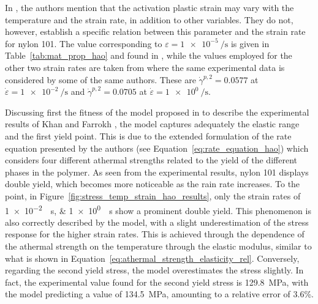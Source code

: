 In \cite{haoUnifiedAmorphousCrystalline2022}, the authors mention that the activation plastic strain may vary with the temperature and the strain rate, in addition to other variables.
They do not, however, establish a specific relation between this parameter and the strain rate for nylon 101.
The value corresponding to $\varepsilon=\SI{1e-5}{\per\second}$ is given in Table~\ref{tab:mat_prop_hao} and found in \cite{haoUnifiedAmorphousCrystalline2022}, while the values employed for the other two strain rates are taken from \cite{haoRatedependentConstitutiveModel2022} where the same experimental data is considered by some of the same authors.
These are $\dot\gamma^{p,2}=\num{0.0577}$ at $\dot\varepsilon = \SI{1e-2}{\per\second}$ and $\dot\gamma^{p,2}=\num{0.0705}$ at $\dot\varepsilon = \SI{1e0}{\per\second}$.

Discussing first the fitness of the model proposed in \cite{haoUnifiedAmorphousCrystalline2022} to describe the experimental results of Khan and Farrokh \citep{khanThermomechanicalResponseNylon2006}, the model captures adequately the elastic range and the first yield point.
This is due to the extended formulation of the rate equation presented by the authors (see Equation~\eqref{eq:rate_equation_hao}) which considers four different athermal strengths related to the yield of the different phases in the polymer.
As seen from the experimental results, nylon 101 displays double yield, which becomes more noticeable as the rain rate increases.
To the point, in Figure~\ref{fig:stress_temp_strain_hao_results}, only the strain rates of \SIlist{1e-2;1e0}{\per\second} show a prominent double yield.
This phenomenon is also correctly described by the model, with a slight underestimation of the stress response for the higher strain rates.
This is achieved through the dependence of the athermal strength on the temperature through the elastic modulus, similar to what is shown in Equation~\eqref{eq:athermal_strength_elasticity_rel}.
Conversely, regarding the second yield stress, the model overestimates the stress slightly.
In fact, the experimental value found for the second yield stress is \SI{129.8}{\mega\pascal}, with the model predicting a value of \SI{134.5}{\mega\pascal}, amounting to a relative error of \num{3.6}\%.


